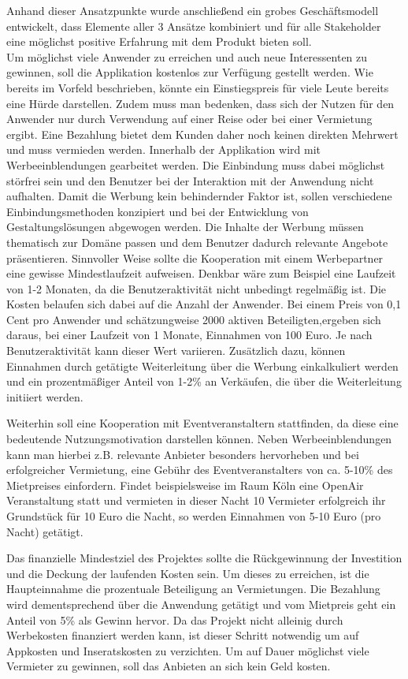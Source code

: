 \newpage
Anhand dieser Ansatzpunkte wurde anschließend ein grobes Geschäftsmodell entwickelt, dass Elemente aller 3 Ansätze kombiniert und für alle Stakeholder eine möglichst positive Erfahrung mit dem Produkt bieten soll.\\

Um möglichst viele Anwender zu erreichen und auch neue Interessenten zu gewinnen, soll die Applikation kostenlos zur Verfügung gestellt werden. Wie bereits im Vorfeld beschrieben, könnte ein Einstiegspreis für viele Leute bereits eine Hürde darstellen. Zudem muss man bedenken, dass sich der Nutzen für den Anwender nur durch Verwendung auf einer Reise oder bei einer Vermietung ergibt. Eine Bezahlung bietet dem Kunden daher noch keinen direkten Mehrwert und muss vermieden werden. 
Innerhalb der Applikation wird mit Werbeeinblendungen gearbeitet werden. Die Einbindung muss dabei möglichst störfrei sein und den Benutzer bei der Interaktion mit der Anwendung nicht aufhalten. Damit die Werbung kein behindernder Faktor ist, sollen verschiedene Einbindungsmethoden konzipiert und bei der Entwicklung von Gestaltungslösungen abgewogen werden. Die Inhalte der Werbung müssen thematisch zur Domäne passen und dem Benutzer dadurch relevante Angebote präsentieren. Sinnvoller Weise sollte die Kooperation mit einem Werbepartner eine gewisse Mindestlaufzeit aufweisen. Denkbar wäre zum Beispiel eine Laufzeit von 1-2 Monaten, da die Benutzeraktivität nicht unbedingt regelmäßig ist. Die Kosten belaufen sich dabei auf die Anzahl der Anwender. Bei einem Preis von 0,1 Cent pro Anwender und schätzungweise 2000 aktiven Beteiligten,ergeben sich daraus, bei einer Laufzeit von 1 Monate,  Einnahmen von 100 Euro. Je nach Benutzeraktivität kann dieser Wert variieren. 
Zusätzlich dazu, können Einnahmen durch getätigte Weiterleitung über die Werbung einkalkuliert werden und ein prozentmäßiger Anteil von 1-2\% an Verkäufen, die über die Weiterleitung initiiert werden.

Weiterhin soll eine Kooperation mit Eventveranstaltern stattfinden, da diese eine bedeutende Nutzungsmotivation darstellen können. Neben Werbeeinblendungen kann man hierbei z.B. relevante Anbieter besonders hervorheben und bei erfolgreicher Vermietung, eine Gebühr des Eventveranstalters von ca. 5-10\% des Mietpreises einfordern. Findet beispielsweise im Raum Köln eine OpenAir Veranstaltung statt und vermieten in dieser Nacht 10 Vermieter erfolgreich ihr Grundstück für 10 Euro die Nacht, so werden Einnahmen von 5-10 Euro (pro Nacht) getätigt. 

Das finanzielle Mindestziel des Projektes sollte die Rückgewinnung der Investition und die Deckung der laufenden Kosten sein. Um dieses zu erreichen, ist die Haupteinnahme die prozentuale Beteiligung an Vermietungen. Die Bezahlung wird dementsprechend über die Anwendung getätigt und vom Mietpreis geht ein Anteil von 5\% als Gewinn hervor. Da das Projekt nicht alleinig durch Werbekosten finanziert werden kann, ist dieser Schritt notwendig um auf Appkosten und Inseratskosten zu verzichten. Um auf Dauer möglichst viele Vermieter zu gewinnen, soll das Anbieten an sich kein Geld kosten. 
